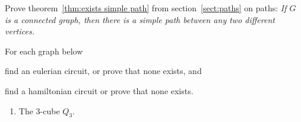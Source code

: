 \begin{prob}\label{prob:prove thm simple path}
 Prove theorem~\ref{thm:exists simple path} from section~\ref{sect:paths}
 on paths:
 \emph{If $G$ is a connected graph, then there is a simple path between
  any two different vertices.}
\end{prob}

\vfill\break

\begin{prob}
 For each graph below
 \begin{enumerate*}[label=(\roman*)]
  \item  find an eulerian circuit, or prove that none exists, and 
  \item  find a hamiltonian circuit or prove that none exists.
 \end{enumerate*}
  
\begin{enumerate}[label=(\alph*),itemsep=0.5cm]
  \item The $3$-cube $Q_3$.
 

\end{enumerate}
\end{prob}
